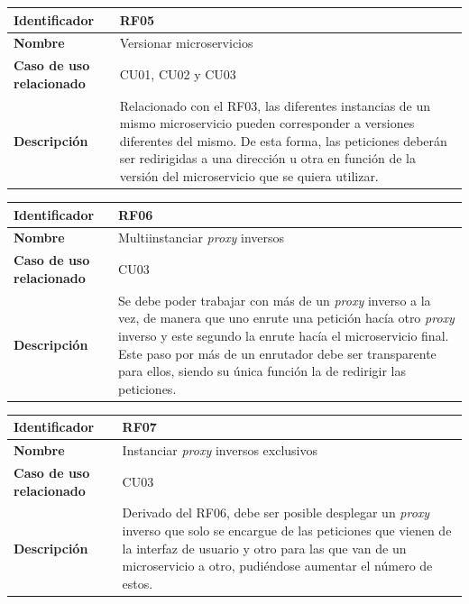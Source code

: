 \documentclass[11pt,spanish,listoffigures]{tfgetsinf}
\begin{document}
\begin{center} \begin{tabular}{| l | p{9.5cm} |}
\hline
\textbf{Identificador} & RF05
\\ \hline
\textbf{Nombre} & Versionar microservicios
\\ \hline
\textbf{Caso de uso relacionado} & CU01, CU02 y CU03
\\ \hline
\textbf{Descripción} & Relacionado con el RF03, las diferentes instancias de un mismo microservicio pueden corresponder a versiones diferentes del mismo. De esta forma, las peticiones deberán ser redirigidas a una dirección u otra en función de la versión del microservicio que se quiera utilizar.
\\ \hline \end{tabular} \end{center}

\begin{center} \begin{tabular}{| l | p{9.5cm} |}
\hline
\textbf{Identificador} & RF06
\\ \hline
\textbf{Nombre} & Multiinstanciar \emph{proxy} inversos
\\ \hline
\textbf{Caso de uso relacionado} & CU03
\\ \hline
\textbf{Descripción} & Se debe poder trabajar con más de un \emph{proxy} inverso a la vez, de manera que uno enrute una petición hacía otro \emph{proxy} inverso y este segundo la enrute hacía el microservicio final. Este paso por más de un enrutador debe ser transparente para ellos, siendo su única función la de redirigir las peticiones.
\\ \hline \end{tabular} \end{center}

\begin{center} \begin{tabular}{| l | p{9.5cm} |}
\hline
\textbf{Identificador} & RF07
\\ \hline
\textbf{Nombre} & Instanciar \emph{proxy} inversos exclusivos
\\ \hline
\textbf{Caso de uso relacionado} & CU03
\\ \hline
\textbf{Descripción} & Derivado del RF06, debe ser posible desplegar un \emph{proxy} inverso que solo se encargue de las peticiones que vienen de la interfaz de usuario y otro para las que van de un microservicio a otro, pudiéndose aumentar el número de estos.
\\ \hline \end{tabular} \end{center}
\end{document}
